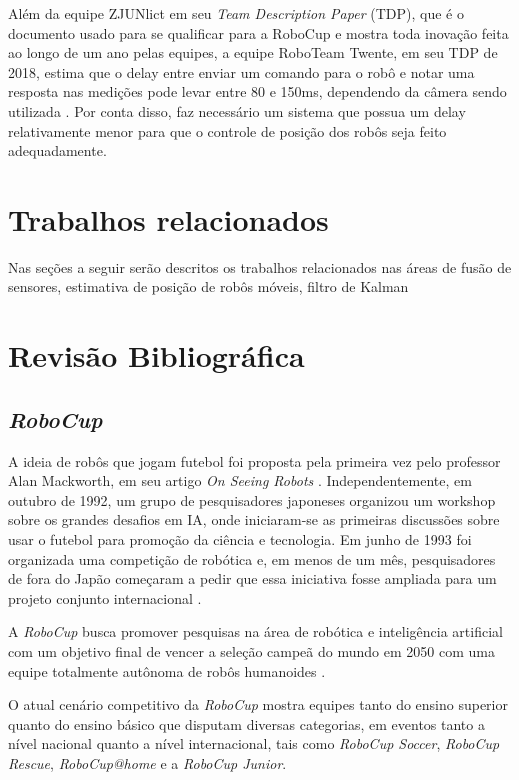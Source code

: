 \documentclass[acronym, symbols]{fei}
\begin{document}
		Além da equipe ZJUNlict em seu \textit{Team Description Paper} (TDP), que é o documento usado para se qualificar para a RoboCup e mostra toda inovação feita ao longo de um ano pelas equipes, a equipe RoboTeam Twente, em seu TDP de 2018, estima que o delay entre enviar um comando para o robô e notar uma resposta nas medições pode levar entre 80 e 150ms, dependendo da câmera sendo utilizada \cite{tdptwente2018}. Por conta disso, faz necessário um sistema que possua um delay relativamente menor para que o controle de posição dos robôs seja feito adequadamente. 
		
\chapter{Trabalhos relacionados}
	Nas seções a seguir serão descritos os trabalhos relacionados nas áreas de fusão de sensores, estimativa de posição de robôs móveis, filtro de Kalman 
		
\chapter{Revisão Bibliográfica}

	\section{\textit{RoboCup}}
	
		A ideia de robôs que jogam futebol foi proposta pela primeira vez pelo professor Alan Mackworth, em seu artigo \textit{On Seeing Robots} \cite{OnSeeingRobots}. Independentemente, em outubro de 1992, um grupo de pesquisadores japoneses organizou um workshop sobre os grandes desafios em IA, onde iniciaram-se as primeiras discussões sobre usar o futebol para promoção da ciência e tecnologia. Em junho de 1993 foi organizada uma competição de robótica e, em menos de um mês, pesquisadores de fora do Japão começaram a pedir que essa iniciativa fosse ampliada para um projeto conjunto internacional \cite{RoboCup}.
		
		A \textit{RoboCup} busca promover pesquisas na área de robótica e inteligência artificial com um objetivo final de vencer a seleção campeã do mundo em 2050 com uma equipe totalmente autônoma de robôs humanoides \cite{RoboCup}.
		
		O atual cenário competitivo da \textit{RoboCup} mostra equipes tanto do ensino superior quanto do ensino básico que disputam diversas categorias, em eventos tanto a nível nacional quanto a nível internacional, tais como \textit{RoboCup Soccer}, \textit{RoboCup Rescue}, \textit{RoboCup@home} e a \textit{RoboCup Junior}.
	
\end{document}
